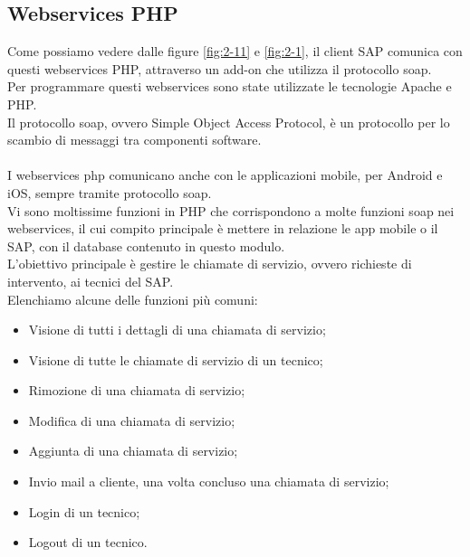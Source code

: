 \subsection{Webservices PHP}
Come possiamo vedere dalle figure \ref{fig:2-11} e \ref{fig:2-1}, il client SAP comunica con questi webservices PHP, attraverso un add-on che utilizza il protocollo \gls{soap}.\\
Per programmare questi webservices sono state utilizzate le tecnologie Apache e PHP.\\ 
Il protocollo \gls{soap}, ovvero Simple Object Access Protocol, è un protocollo per lo scambio di messaggi tra componenti software.\\\\
I webservices php comunicano anche con le applicazioni mobile, per Android e iOS, sempre tramite protocollo \gls{soap}.\\
Vi sono moltissime funzioni in PHP che corrispondono a molte funzioni \gls{soap} nei webservices, il cui compito principale è mettere in relazione le app mobile o il SAP, con il database contenuto in questo modulo.\\
L'obiettivo principale è gestire le chiamate di servizio, ovvero richieste di intervento, ai tecnici del SAP.\\
Elenchiamo alcune delle funzioni più comuni:
\begin{itemize}
	\item Visione di tutti i dettagli di una chiamata di servizio;
	\item Visione di tutte le chiamate di servizio di un tecnico;
	\item Rimozione di una chiamata di servizio;
	\item Modifica di una chiamata di servizio;
	\item Aggiunta di una chiamata di servizio;
	\item Invio mail a cliente, una volta concluso una chiamata di servizio;
	\item Login di un tecnico;
	\item Logout di un tecnico.
\end{itemize}
\newpage
